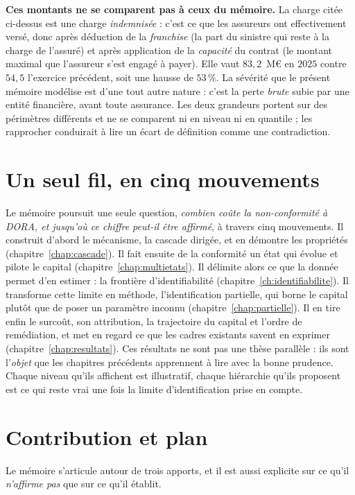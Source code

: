 \begin{attention}
\textbf{Ces montants ne se comparent pas à ceux du mémoire.} La charge citée ci-dessus est une
charge \emph{indemnisée} : c'est ce que les assureurs ont effectivement versé, donc après
déduction de la \emph{franchise} (la part du sinistre qui reste à la charge de l'assuré) et après
application de la \emph{capacité} du contrat (le montant maximal que l'assureur s'est engagé à
payer). Elle vaut $83{,}2$~M\euro{} en $2025$ contre $54{,}5$ l'exercice précédent, soit une
hausse de $53\,\%$. La sévérité que le présent mémoire modélise est d'une tout autre nature :
c'est la perte \emph{brute} subie par une entité financière, avant toute assurance. Les deux
grandeurs portent sur des périmètres différents et ne se comparent ni en niveau ni en quantile ;
les rapprocher conduirait à lire un écart de définition comme une contradiction.
\end{attention}


\section{Un seul fil, en cinq mouvements}
Le mémoire poursuit une seule question, \emph{combien coûte la non-conformité à DORA, et
jusqu'où ce chiffre peut-il être affirmé}, à travers cinq mouvements. Il construit d'abord le
mécanisme, la cascade dirigée, et en démontre les propriétés (chapitre~\ref{chap:cascade}). Il
fait ensuite de la conformité un état qui évolue et pilote le capital
(chapitre~\ref{chap:multietats}). Il délimite alors ce que la donnée permet d'en estimer : la
frontière d'identifiabilité (chapitre~\ref{ch:identifiabilite}). Il transforme cette limite en
méthode, l'identification partielle, qui borne le capital plutôt que de poser un paramètre
inconnu (chapitre~\ref{chap:partielle}). Il en tire enfin le surcoût, son attribution, la
trajectoire du capital et l'ordre de remédiation, et met en regard ce que les cadres existants
savent en exprimer (chapitre~\ref{chap:resultats}). Ces résultats ne sont pas une thèse
parallèle : ils sont l'\emph{objet} que les chapitres précédents apprennent à lire avec la bonne
prudence. Chaque niveau qu'ils affichent est illustratif, chaque hiérarchie qu'ils proposent est
ce qui reste vrai une fois la limite d'identification prise en compte.

\section{Contribution et plan}
Le mémoire s'articule autour de trois apports, et il est aussi explicite sur ce qu'il
\emph{n'affirme pas} que sur ce qu'il établit.

